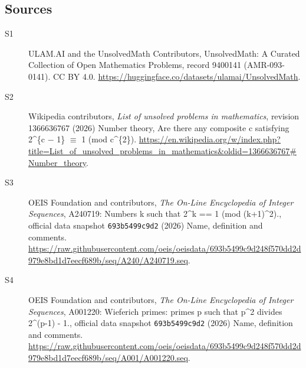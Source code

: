 \documentclass[11pt]{article}
\begin{document}
\subsection{Sources}
\begin{description}
\item[\hypertarget{source:9400141:1}{S1}] ULAM.AI and the UnsolvedMath Contributors, UnsolvedMath: A Curated Collection of Open Mathematics Problems, record 9400141 (AMR-093-0141). CC BY 4.0. \url{https://huggingface.co/datasets/ulamai/UnsolvedMath}.
\item[\hypertarget{source:9400141:2}{S2}] Wikipedia contributors, \emph{List of unsolved problems in mathematics}, revision 1366636767 (2026) Number theory, Are there any composite c satisfying 2\textasciicircum{}\{c − 1\} $\equiv$ 1 (mod c\textasciicircum{}\{2\}). \url{https://en.wikipedia.org/w/index.php?title=List_of_unsolved_problems_in_mathematics&oldid=1366636767#Number_theory}.
\item[\hypertarget{source:9400141:3}{S3}] OEIS Foundation and contributors, \emph{The On-Line Encyclopedia of Integer Sequences}, A240719: Numbers k such that 2\textasciicircum{}k == 1 (mod (k+1)\textasciicircum{}2)., official data snapshot \texttt{693b5499c9d2} (2026) Name, definition and comments. \url{https://raw.githubusercontent.com/oeis/oeisdata/693b5499c9d248f570dd2d979e8bd1d7eecf689b/seq/A240/A240719.seq}.
\item[\hypertarget{source:9400141:4}{S4}] OEIS Foundation and contributors, \emph{The On-Line Encyclopedia of Integer Sequences}, A001220: Wieferich primes: primes p such that p\textasciicircum{}2 divides 2\textasciicircum{}(p-1) - 1., official data snapshot \texttt{693b5499c9d2} (2026) Name, definition and comments. \url{https://raw.githubusercontent.com/oeis/oeisdata/693b5499c9d248f570dd2d979e8bd1d7eecf689b/seq/A001/A001220.seq}.
\end{description}
\label{end:9400141}
\end{document}
